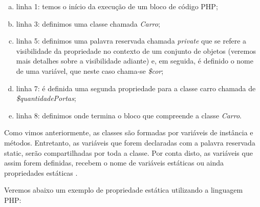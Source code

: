 \begin{enumerate}[a)]
    \item linha 1: temos o início da execução de um bloco de código PHP;
    \item linha 3: definimos uma classe chamada \textit{Carro};
    \item linha 5: definimos uma palavra reservada chamada
    \textit{private} que se refere a visibilidade da propriedade no contexto  de
    um conjunto de objetos (veremos mais detalhes sobre a visibilidade adiante)
    e, em seguida, é definido o nome de uma variável, que neste caso chama-se
    \textit{\$cor};
    \item linha 7: é definida uma segunda propriedade para a classe
    carro chamada de \textit{\$quantidadePortas};
    \item linha 8: definimos onde termina o bloco que compreende a
    classe \textit{Carro}.
\end{enumerate}


Como vimos anteriormente, as classes são formadas por variáveis de instância e
métodos. Entretanto, as variáveis que forem declaradas com a palavra reservada
static, serão compartilhadas por toda a classe. Por conta disto, as variáveis
que assim forem definidas, recebem o nome de variáveis estáticas ou ainda
propriedades estáticas \cite{learningJava}.

Veremos abaixo um exemplo de propriedade estática utilizando a linguagem PHP:
